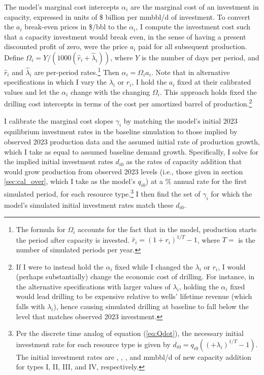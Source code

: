 \documentclass[12pt]{article}
\begin{document}
The model's marginal cost intercepts $\alpha_i$ are the marginal cost of an investment in capacity, expressed in units of \$ billion per mmbbl/d of investment. To convert the $a_i$ break-even prices in \$/bbl to the $\alpha_i$, I compute the investment cost such that a capacity investment would break even, in the sense of having a present discounted profit of zero, were the price $a_i$ paid for all subsequent production. Define $\Omega_i=Y/(1000(\hat{r}_i+\hat{\lambda}_i))$, where $Y$ is the number of days per period, and $\hat{r}_i$ and $\hat{\lambda}_i$ are per-period rates.\footnote{The formula for $\Omega_i$ accounts for the fact that in the model, production starts the period after capacity is invested. $\hat{r}_i=(1+r_i)^{1/T}-1$, where $T=$ is the number of simulated periods per year.} Then $\alpha_i=\Omega_i a_i$. Note that in alternative specifications in which I vary the $\lambda_i$ or $r_i$, I hold the $a_i$ fixed at their calibrated values and let the $\alpha_i$ change with the changing $\Omega_i$. This approach holds fixed the drilling cost intercepts in terms of the cost per amortized barrel of production.\footnote{If I were to instead hold the $\alpha_i$ fixed while I changed the $\lambda_i$ or $r_i$, I would (perhaps substantially) change the economic cost of drilling. For instance, in the alternative specifications with larger values of $\lambda_i$, holding the $\alpha_i$ fixed would lead drilling to be expensive relative to wells' lifetime revenue (which falls with $\lambda_i$), hence causing simulated drilling at baseline to fall below the level that matches observed 2023 investment.}

I calibrate the marginal cost slopes $\gamma_i$ by matching the model's initial 2023 equilibrium investment rates in the baseline simulation to those implied by observed 2023 production data and the assumed initial rate of production growth, which I take as equal to assumed baseline demand growth. Specifically, I solve for the implied initial investment rates $d_{i0}$ as the rates of capacity addition that would grow production from observed 2023 levels (i.e., those given in section \ref{sec:cal_over}, which I take as the model's $q_{i0}$) at a \unskip\% annual rate for the first simulated period, for each resource type.\footnote{Per the discrete time analog of equation (\ref{eq:Qdot}), the necessary initial investment rate for each resource type is given by $d_{i0}=q_{i0}((+\lambda_i)^{1/T}-1)$. The initial investment rates are \unskip, \unskip, \unskip, and mmbbl/d of new capacity addition for types I, II, III, and IV, respectively.} I then find the set of $\gamma_i$ for which the model's simulated initial investment rates match these $d_{i0}$.
\end{document}
